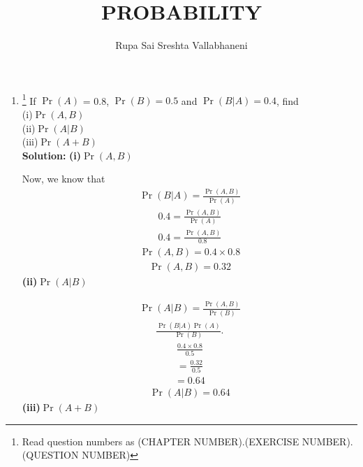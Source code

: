 \documentclass{article}
\begin{document}
\title{PROBABILITY}
\author{\Large Rupa Sai Sreshta Vallabhaneni}
\date{}

\maketitle
\begin{enumerate}[label=13.\arabic{enumi}.\arabic{enumii}]%
\setcounter{enumi}{0}
\setcounter{enumii}{3}

\item \footnote{Read question numbers as (CHAPTER NUMBER).(EXERCISE NUMBER).(QUESTION NUMBER)}  If $\Pr{(A)}$ = 0.8, $\Pr{(B)} = 0.5$ and $\Pr{(B \vert A) = 0.4}$, find  \\
(i)$\Pr{(A,B)}$ 
\\
 (ii)$\Pr{(A \vert B)}$
 \\
 (iii)$\Pr{(A+B)}$
\\[1ex]

\textbf{Solution:}
 \textbf{(i)}\textbf{$\Pr{(A,B)}$}
 
 Now, we know that
 \begin{align}
\Pr{(B \vert A)}= \frac{\Pr{(A , B)}}{\Pr{(A)}}
 \end{align}
 \begin{align}
 0.4=\frac{\Pr{(A, B)}}{\Pr{(A)}}
 \end{align}
 \begin{align}
 0.4=\frac{\Pr{(A, B)}}{0.8}
 \end{align}
 \begin{align}
 \Pr{(A,B)}=0.4 \times 0.8
 \end{align}
 \begin{align}
 \boxed{\Pr{(A,B)}=0.32}
 \end{align}
 \textbf{(ii)}\textbf{$\Pr{(A \vert B)}$}
 
 \begin{align}
 \Pr{(A \vert B)}= \frac{\Pr{ (A,B)}}{\Pr{(B)}}
 \end{align}
 \begin{align}
 \frac{\Pr{ (B \vert A)}\Pr{(A)}}{\Pr{(B)}}.
 \end{align}
 \begin{align}
  \frac{0.4 \times 0.8}{0.5}
 \end{align}
 \begin{align}
 = \frac{0.32}{0.5}
 \end{align}
  \begin{align}
 = 0.64
 \end{align}
  \begin{align}
\boxed{\Pr{(A \vert B)} = 0.64}
 \end{align}
  \textbf{(iii)}\textbf{$\Pr{(A+B)}$}
 

\end{enumerate}
\end{document}

